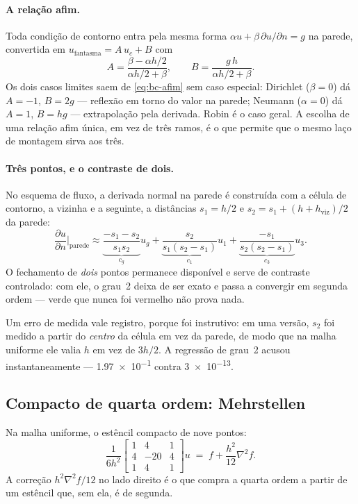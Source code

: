 \paragraph{A relação afim.} Toda condição de contorno entra pela mesma forma
$\alpha u + \beta\,\partial u/\partial n = g$ na parede, convertida em
$u_{\text{fantasma}} = A\,u_c + B$ com
\begin{equation}
  A = \frac{\beta - \alpha h/2}{\alpha h/2 + \beta},
  \qquad
  B = \frac{g\,h}{\alpha h/2 + \beta}.
  \label{eq:bc-afim}
\end{equation}
Os dois casos limites saem de \eqref{eq:bc-afim} sem caso especial: Dirichlet
($\beta=0$) dá $A=-1$, $B=2g$ --- reflexão em torno do valor na parede; Neumann
($\alpha=0$) dá $A=1$, $B=hg$ --- extrapolação pela derivada. Robin é o caso
geral. A escolha de uma relação afim única, em vez de três ramos, é o que permite
que o mesmo laço de montagem sirva aos três.

\paragraph{Três pontos, e o contraste de dois.} No esquema de fluxo, a derivada
normal na parede é construída com a célula de contorno, a vizinha e a seguinte,
a distâncias $s_1=h/2$ e $s_2 = s_1 + (h+h_{\mathrm{viz}})/2$ da parede:
\begin{equation}
  \frac{\partial u}{\partial n}\bigg|_{\text{parede}}
  \approx
  \underbrace{\frac{-s_1-s_2}{s_1 s_2}}_{c_g} u_g
  + \underbrace{\frac{s_2}{s_1(s_2-s_1)}}_{c_1} u_1
  + \underbrace{\frac{-s_1}{s_2(s_2-s_1)}}_{c_3} u_3 .
  \label{eq:fech3}
\end{equation}
O fechamento de \emph{dois} pontos permanece disponível e serve de contraste
controlado: com ele, o grau~2 deixa de ser exato e passa a convergir em segunda
ordem --- verde que nunca foi vermelho não prova nada.

Um erro de medida vale registro, porque foi instrutivo: em uma versão, $s_2$ foi
medido a partir do \emph{centro} da célula em vez da parede, de modo que na malha
uniforme ele valia $h$ em vez de $3h/2$. A regressão de grau~2 acusou
instantaneamente --- \num{1.97e-1} contra \num{3e-13}.

\subsection{Compacto de quarta ordem: Mehrstellen}
\label{sec:aprox-mehrstellen}

Na malha uniforme, o estêncil compacto de nove pontos:
\begin{equation}
  \frac{1}{6h^2}
  \begin{bmatrix}
    1 & 4 & 1\\
    4 & -20 & 4\\
    1 & 4 & 1
  \end{bmatrix} u
  \;=\;
  f + \frac{h^2}{12}\nabla^2 f .
  \label{eq:mehrstellen}
\end{equation}
A correção $h^2\nabla^2 f/12$ no lado direito é o que compra a quarta ordem a
partir de um estêncil que, sem ela, é de segunda.

